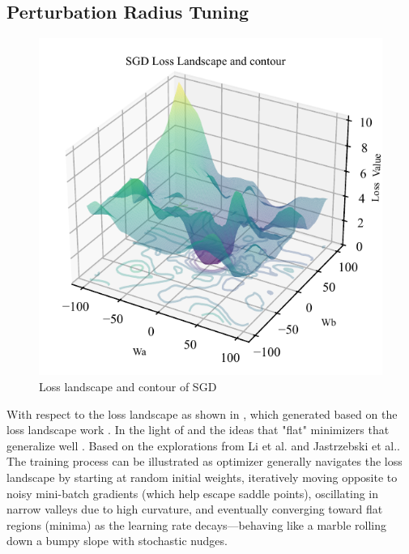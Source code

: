 \documentclass[10pt,twocolumn,letterpaper]{article}
\begin{document}
\subsection{Perturbation Radius Tuning}
\label{subsec:3.2}
\begin{figure}[htbp]
	\center
	\vspace{-10pt}  
	\includegraphics[width=\columnwidth]{images/SGD_LLC.pdf}
	\caption{Loss landscape and contour of SGD}
	\label{fig:SGD_LLC}
	\vspace{-15pt} 
\end{figure}
With respect to the loss landscape as shown in , which generated based on the loss landscape work \cite{li2018visualizinglosslandscapeneural}. 
In the light of  and the ideas that "flat" minimizers that generalize well \cite{chaudhari2017entropysgdbiasinggradientdescent}. Based on the explorations from Li et al.\cite{li2018visualizinglosslandscapeneural} and Jastrzebski et al.\cite{jastrzebski2020breakevenpointoptimizationtrajectories}. The training process can be illustrated as optimizer generally navigates the loss landscape by starting at random initial weights, iteratively moving opposite to noisy mini-batch gradients (which help escape saddle points), oscillating in narrow valleys due to high curvature, and eventually converging toward flat regions (minima) as the learning rate decays—behaving like a marble rolling down a bumpy slope with stochastic nudges. 
\end{document}
